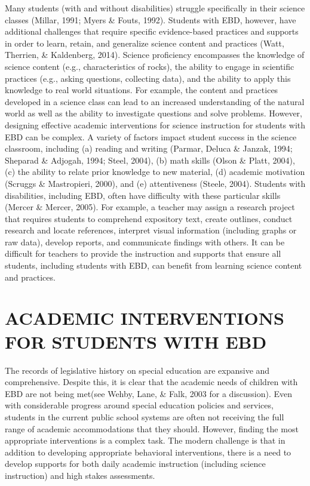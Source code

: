 \documentclass[11.5pt]{sig-alternate} %
\begin{document}
\begin{large}
Many students (with and without disabilities) struggle specifically in their science classes (Millar, 1991; Myers \& Fouts, 1992). Students with EBD, however, have additional challenges that require specific evidence-based practices and supports in order to learn, retain, and generalize science content and practices (Watt, Therrien, \& Kaldenberg, 2014). Science proficiency encompasses the knowledge of science content (e.g., characteristics of rocks), the ability to engage in scientific practices (e.g., asking questions, collecting data), and the ability to apply this knowledge to real world situations. For example, the content and practices developed in a science class can lead to an increased understanding of the natural world as well as the ability to investigate questions and solve problems. However, designing effective academic interventions for science instruction for students with EBD can be complex. A variety of factors impact student success in the science classroom, including (a) reading and writing (Parmar, Deluca \& Janzak, 1994; Sheparad \& Adjogah, 1994; Steel, 2004), (b) math skills (Olson \& Platt, 2004), (c) the ability to relate prior knowledge to new material, (d) academic motivation (Scruggs \& Mastropieri, 2000), and (e) attentiveness (Steele, 2004). Students with disabilities, including EBD, often have difficulty with these particular skills (Mercer \& Mercer, 2005). For example, a teacher may assign a research project that requires students to comprehend expository text, create outlines, conduct research and locate references, interpret visual information (including graphs or raw data), develop reports, and communicate findings with others. It can be difficult for teachers to provide the instruction and supports that ensure all students, including students with EBD, can benefit from learning science content and practices.

\section*{ACADEMIC INTERVENTIONS FOR STUDENTS WITH EBD}
	
 The records of legislative history on special education are expansive and comprehensive. Despite this, it is clear that the academic needs of children with EBD are not being met(see Wehby, Lane, \& Falk, 2003 for a discussion). Even with considerable progress around special education policies and services, students in the current public school systems are often not receiving the full range of academic accommodations that they should. However, finding the most appropriate interventions is a complex task. The modern challenge is that in addition to developing appropriate behavioral interventions, there is a need to develop supports for both daily academic instruction (including science instruction) and high stakes assessments. 
	

\end{large}
\end{document}
